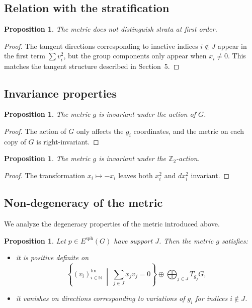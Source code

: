 \documentclass[11pt]{amsart}
\newtheorem{proposition}[theorem]{Proposition}
\begin{document}
\subsection{Relation with the stratification}

\begin{proposition}
The metric does not distinguish strata at first order.
\end{proposition}

\begin{proof}
The tangent directions corresponding to inactive indices $i \notin J$ appear in the first term $\sum v_i^2$, but the group components only appear when $x_i \neq 0$. This matches the tangent structure described in Section~5.
\end{proof}

\subsection{Invariance properties}

\begin{proposition}
The metric $g$ is invariant under the action of $G$.
\end{proposition}

\begin{proof}
The action of $G$ only affects the $g_i$ coordinates, and the metric on each copy of $G$ is right-invariant.
\end{proof}

\begin{proposition}
The metric $g$ is invariant under the $\mathbb{Z}_2$-action.
\end{proposition}

\begin{proof}
The transformation $x_i \mapsto -x_i$ leaves both $x_i^2$ and $dx_i^2$ invariant.
\end{proof}
\subsection{Non-degeneracy of the metric}

We analyze the degeneracy properties of the metric introduced above.

\begin{proposition}
Let $p \in E^{\mathrm{sph}}(G)$ have support $J$. Then the metric $g$ satisfies:
\begin{itemize}
\item it is positive definite on
\[
\left\{
(v_i)_{i\in\mathbb{N}}^{\mathrm{fin}}
\;\middle|\;
\sum_{j\in J} x_j v_j = 0
\right\}
\oplus
\bigoplus_{j\in J} T_{g_j}G,
\]
\item it vanishes on directions corresponding to variations of $g_i$ for indices $i \notin J$.
\end{itemize}
\end{proposition}
\end{document}
